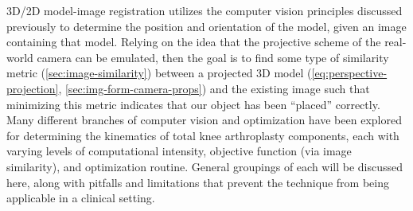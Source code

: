 3D/2D model-image registration utilizes the computer vision principles discussed previously to determine the position and orientation of the model, given an image containing that model. Relying on the idea that the projective scheme of the real-world camera can be emulated, then the goal is to find some type of similarity metric (\cref{sec:image-similarity}) between a projected 3D model (\cref{eq:perspective-projection}, \cref{sec:img-form-camera-props}) and the existing image such that minimizing this metric indicates that our object has been ``placed'' correctly. Many different branches of computer vision and optimization have been explored for determining the kinematics of total knee arthroplasty components, each with varying levels of computational intensity, objective function (via image similarity), and optimization routine. General groupings of each will be discussed here, along with pitfalls and limitations that prevent the technique from being applicable in a clinical setting.
